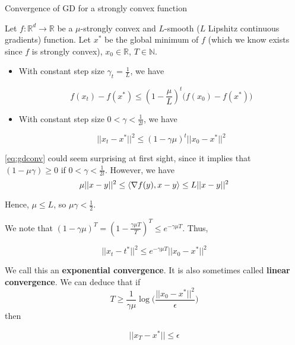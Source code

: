 \documentclass[
10pt, %
a4paper, %
oneside, %
headinclude,footinclude, %
BCOR5mm, %
]{scrartcl}
\begin{document}
\begin{theorem}{Convergence of GD for a strongly convex function}

    Let $f: \mathbb{R}^d\rightarrow \mathbb{R}	$ be a  $\mu$-strongly convex and $L$-smooth ($L$ Lipshitz continuous gradients) function. Let $x^*$ be the global minimum of $f$ (which we know exists since $f$ is strongly convex), $x_0\in \mathbb{R} $, $T\in \mathbb{N}$.

    \begin{itemize}
	\item With constant step size $\gamma_t = \frac{1}{L} $, we have

	    \begin{equation*}
		f(x_t)-f(x^*)\leq ( 1- \frac{\mu}{L})^t\big(f(x_0)-f(x^*)\big) 
	    \end{equation*}
        \item With constant step size $0<\gamma < \frac{1}{2l} $, we have

    \begin{equation}
	\label{eq:gdconv}
	||x_t-x^*||^2\leq (1-\gamma \mu)^t ||x_0-x^*||^2
    \end{equation}
    \end{itemize}
\end{theorem}

\begin{remark}
    \ref{eq:gdconv} could seem surprising at first sight, since it implies that $ (1-\mu\gamma)\geq 0$ if $0<\gamma< \frac{1}{2l}$. However, we have
\begin{equation*}
    \mu ||x-y||^2\leq \langle \-\nabla f(y), x-y \rangle \leq L||x-y||^2
\end{equation*}

Hence, $\mu\leq L$, so $\mu\gamma < \frac{1}{2} $.
\end{remark}

\begin{corollary}
    We note that $ (1-\gamma \mu)^T = (1- \frac{ \gamma \mu T}{T} )^T\leq e^{-\gamma \mu T}$. Thus,

    \begin{equation*}
	||x_t-t^*||^2\leq e^{-\gamma\mu T}||x_0-x^*||^2
    \end{equation*}

    We call this an \textbf{{exponential convergence}}. It is also sometimes called \textbf{{linear convergence}}. We can deduce that if 
    \begin{equation*}
	T \geq \frac{1}{ \gamma \mu} \log \big( \frac{||x_0-x^*||^2}{\epsilon}  \big)
    \end{equation*}
    then

    \begin{equation*}
        ||x_T-x^*||\leq \epsilon
    \end{equation*}
\end{corollary}
\end{document}
